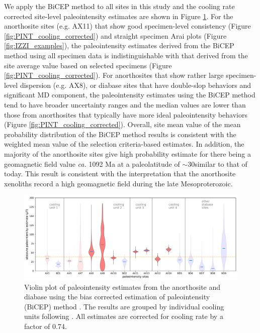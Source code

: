 \documentclass[11pt,letterpaper]{article}
\begin{document}
We apply the BiCEP method to all sites in this study and the cooling rate corrected site-level paleointensity estimates are shown in Figure \ref{fig:BiCEP}. For the anorthosite sites (e.g. AX11) that show good specimen-level consistency (Figure \ref{fig:PINT_cooling_corrected}) and straight specimen Arai plots (Figure \ref{fig:IZZI_examples}), the paleointensity estimates derived from the BiCEP method using all specimen data is indistinguishable with that derived from the site average value based on selected specimens (Figure \ref{fig:PINT_cooling_corrected}). For anorthosites that show rather large specimen-level dispersion (e.g. AX8), or diabase sites that have double-slop behaviors and significant MD component, the paleointensity estimates using the BiCEP method tend to have broader uncertainty ranges and the median values are lower than those from anorthosites that typically have more ideal paleointensity behaviors (Figure \ref{fig:PINT_cooling_corrected}). Overall, site mean value of the mean probability distribution of the BiCEP method results is consistent with the weighted mean value of the selection criteria-based estimates. In addition, the majority of the anorthosite sites give high probability estimate for there being a geomagnetic field value \textit{ca.} 1092 Ma at a paleolatitude of $\sim$30\textdegree similar to that of today. This result is consistent with the interpretation that the anorthosite xenoliths record a high geomagnetic field during the late Mesoproterozoic.



\begin{figure}[h!]
\noindent\includegraphics[width=\textwidth]{code/code_output/AX_BD_BiCEP.pdf}
\centering
\caption{\footnotesize{Violin plot of paleointensity estimates from the anorthosite and diabase using the bias corrected estimation of paleointensity (BiCEP) method \cite{Cych2021a}. The results are grouped by individual cooling units following . All estimates are corrected for cooling rate by a factor of 0.74. }}
\label{fig:BiCEP}
\end{figure}



\clearpage




\end{document}
